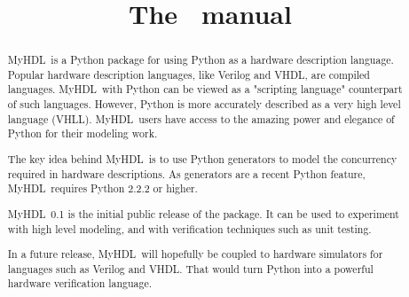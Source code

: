 \documentclass{manual}
\title{The \myhdl\ manual}
\newcommand{\myhdl}{{MyHDL}}
\begin{document}
\maketitle



\begin{abstract}

\noindent

\myhdl\ is a Python package for using Python as a hardware description
language. Popular hardware description languages, like Verilog and
VHDL, are compiled languages. \myhdl\ with Python can be viewed as a
"scripting language" counterpart of such languages. However, Python is
more accurately described as a very high level language
(VHLL). \myhdl\ users have access to the amazing power and elegance of
Python for their modeling work.

The key idea behind \myhdl\ is to use Python generators to model the
concurrency required in hardware descriptions. As generators are a
recent Python feature, \myhdl\ requires Python 2.2.2 or higher.

\myhdl\ 0.1 is the initial public release of the package. It can be
used to experiment with high level modeling, and with verification
techniques such as unit testing. 

In a future release, \myhdl\ will
hopefully be coupled to hardware simulators for languages such as
Verilog and VHDL. That would turn Python into a powerful hardware
verification language.



\end{abstract}

\tableofcontents






\end{document}
